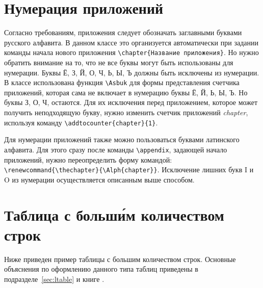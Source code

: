 \chapter{Нумерация приложений}

Согласно требованиям, приложения следует обозначать заглавными буквами русского алфавита. В данном классе это организуется автоматически при задании команды начала нового приложения \verb|\chapter{Название приложения}|. Но нужно обратить внимание на то, что не все буквы могут быть использованы для нумерации. Буквы Ё, З, Й, О, Ч, Ь, Ы, Ъ должны быть исключены из нумерации. В классе использована функция \verb|\Asbuk| для формы представления счетчика приложений, которая сама не включает в нумерацию буквы Ё, Й, Ь, Ы, Ъ. Но буквы З, О, Ч, остаются. Для их исключения перед приложением, которое может получить неподходящую букву, нужно изменить счетчик приложений {\itshape chapter}, используя команду \verb|\addtocounter{chapter}{1}|.

Для нумерации приложений также можно пользоваться буквами латинского алфавита. Для этого сразу после команды  \verb|\appendix|, задающей начало приложений, нужно переопределить форму командой: \verb|\renewcommand{\thechapter}{\Alph{chapter}}|. Исключение лишних букв I и O из нумерации осуществляется описанным выше способом.


\chapter{Таблица с больш\'{и}м количеством строк}
\label{app:table}

Ниже приведен пример таблицы с большим количеством строк. Основные объяснения по оформлению данного типа таблиц приведены в подразделе~\ref{sec:ltable} и книге \cite[раздел 12.5]{Kotelnikov}.

